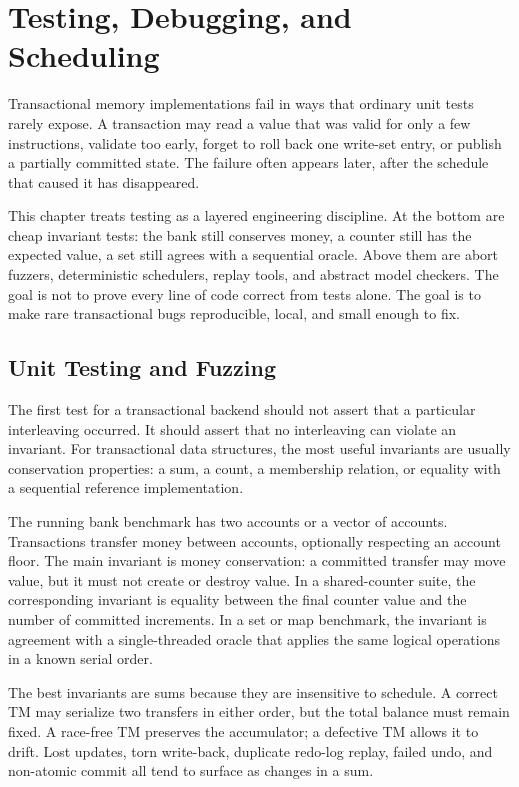\chapter{Testing, Debugging, and Scheduling}

Transactional memory implementations fail in ways that ordinary unit tests rarely expose. A transaction may read a value that was valid for only a few instructions, validate too early, forget to roll back one write-set entry, or publish a partially committed state. The failure often appears later, after the schedule that caused it has disappeared.

This chapter treats testing as a layered engineering discipline. At the bottom are cheap invariant tests: the bank still conserves money, a counter still has the expected value, a set still agrees with a sequential oracle. Above them are abort fuzzers, deterministic schedulers, replay tools, and abstract model checkers. The goal is not to prove every line of code correct from tests alone. The goal is to make rare transactional bugs reproducible, local, and small enough to fix.

\section{Unit Testing and Fuzzing}

The first test for a transactional backend should not assert that a particular interleaving occurred. It should assert that no interleaving can violate an invariant. For transactional data structures, the most useful invariants are usually conservation properties: a sum, a count, a membership relation, or equality with a sequential reference implementation.

The running bank benchmark has two accounts or a vector of accounts. Transactions transfer money between accounts, optionally respecting an account floor. The main invariant is money conservation: a committed transfer may move value, but it must not create or destroy value. In a shared-counter suite, the corresponding invariant is equality between the final counter value and the number of committed increments. In a set or map benchmark, the invariant is agreement with a single-threaded oracle that applies the same logical operations in a known serial order.

The best invariants are sums because they are insensitive to schedule. A correct TM may serialize two transfers in either order, but the total balance must remain fixed. A race-free TM preserves the accumulator; a defective TM allows it to drift. Lost updates, torn write-back, duplicate redo-log replay, failed undo, and non-atomic commit all tend to surface as changes in a sum.

